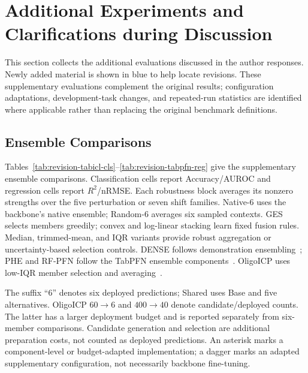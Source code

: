 \clearpage
\begingroup
{}
\color{revisionblue}
\section{Additional Experiments and Clarifications during Discussion}
\label{app:rebuttal-additions}

This section collects the additional evaluations discussed in the author
responses. Newly added material is shown in blue to help locate revisions.
These supplementary evaluations complement the original results; configuration
adaptations, development-task changes, and repeated-run statistics are identified
where applicable rather than replacing the original benchmark definitions.

\subsection{Ensemble Comparisons}
\label{app:revision-ensembles}

Tables~\ref{tab:revision-tabicl-cls}--\ref{tab:revision-tabpfn-reg} give
the supplementary ensemble comparisons. Classification cells report
Accuracy/AUROC and regression cells report $R^2$/nRMSE. Each robustness block
averages its nonzero strengths over the five perturbation or seven shift families.
Native-6 uses the backbone's native ensemble; Random-6 averages six sampled
contexts. GES selects members greedily; convex and log-linear stacking learn
fixed fusion rules. Median, trimmed-mean, and IQR variants provide robust
aggregation or uncertainty-based selection controls. DENSE follows demonstration
ensembling~\citep{khalifa2023dense}; PHE and RF-PFN follow the TabPFN
ensemble components~\citep{hollmann2025tabpfn}. OligoICP uses low-IQR member
selection and averaging~\citep{revision_li2025oligo}.

The suffix ``6'' denotes six deployed predictions; Shared uses Base and five
alternatives. OligoICP $60\!\rightarrow\!6$ and $400\!\rightarrow\!40$
denote candidate/deployed counts. The latter has a larger deployment budget and
is reported separately from six-member comparisons. Candidate generation and
selection are additional preparation costs, not counted as deployed predictions.
An asterisk marks a component-level or budget-adapted implementation; a dagger
marks an adapted supplementary configuration, not necessarily backbone fine-tuning.

